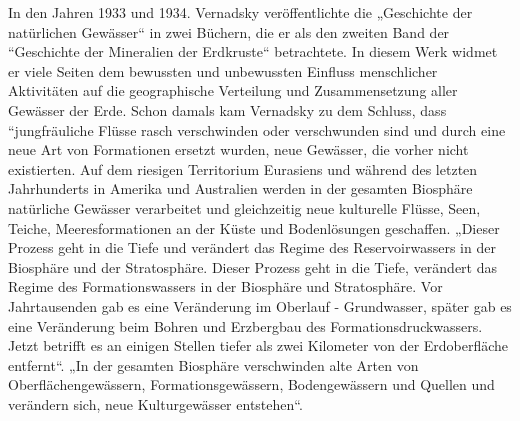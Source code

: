 \documentclass[11pt,a4paper]{article}
\begin{document}
In den Jahren 1933 und 1934. Vernadsky veröffentlichte die „Geschichte der
natürlichen Gewässer“ in zwei Büchern, die er als den zweiten Band der
“Geschichte der Mineralien der Erdkruste“ betrachtete. In diesem Werk widmet
er viele Seiten dem bewussten und unbewussten Einfluss menschlicher
Aktivitäten auf die geographische Verteilung und Zusammensetzung aller
Gewässer der Erde. Schon damals kam Vernadsky zu dem Schluss, dass
“jungfräuliche Flüsse rasch verschwinden oder verschwunden sind und durch eine
neue Art von Formationen ersetzt wurden, neue Gewässer, die vorher nicht
existierten. Auf dem riesigen Territorium Eurasiens und während des letzten
Jahrhunderts in Amerika und Australien werden in der gesamten Biosphäre
natürliche Gewässer verarbeitet und gleichzeitig neue kulturelle Flüsse, Seen,
Teiche, Meeresformationen an der Küste und Bodenlösungen geschaffen. „Dieser
Prozess geht in die Tiefe und verändert das Regime des Reservoirwassers in der
Biosphäre und der Stratosphäre. Dieser Prozess geht in die Tiefe, verändert
das Regime des Formationswassers in der Biosphäre und Stratosphäre. Vor
Jahrtausenden gab es eine Veränderung im Oberlauf - Grundwasser, später gab es
eine Veränderung beim Bohren und Erzbergbau des Formationsdruckwassers. Jetzt
betrifft es an einigen Stellen tiefer als zwei Kilometer von der Erdoberfläche
entfernt“. „In der gesamten Biosphäre verschwinden alte Arten von
Oberflächengewässern, Formationsgewässern, Bodengewässern und Quellen und
verändern sich, neue Kulturgewässer entstehen“\cite[S. 85]{Vernadsky1960}.
\end{document}
